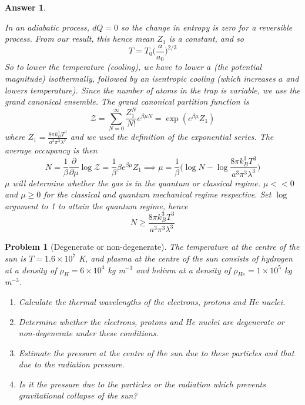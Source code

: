 \documentclass[a4paper]{article}
\theoremstyle{new2}
\newtheorem{ans}{Answer}[section]
\theoremstyle{new}
\newtheorem{qns}{Problem}[section]
\begin{document}
\begin{ans}
\begin{center}
\end{center}
In an adiabatic process, $dQ=0$ so the change in entropy is zero for a reversible process. From our result, this hence mean $Z_1$ is a constant, and so
$$T=T_0\bigg(\frac{a}{a_0}\bigg)^{2/3}$$
So to lower the temperature (cooling), we have to lower $a$ (the potential magnitude) isothermally, followed by an isentropic cooling (which increases $a$ and lowers temperature). Since the number of atoms in the trap is variable, we use the grand canonical ensemble. The grand canonical partition function is
$$\mathcal{Z}=\sum_{N=0}^\infty\frac{Z_1^N}{N!}e^{\beta\mu N}=\exp(e^{\beta\mu}Z_1)$$
where $Z_1=\frac{8\pi k_B^3T^3}{a^3\pi^3\lambda^3}$ and we used the definition of the exponential series. The average occupancy is then
$$N=\frac{1}{\beta}\frac{\partial}{\partial\mu}\log\mathcal{Z}=\frac{1}{\beta}\beta e^{\beta\mu}Z_1\implies \mu=\frac{1}{\beta}\bigg(\log N-\log\frac{8\pi k_B^3T^3}{a^3\pi^3\lambda^3}\bigg)$$
$\mu$ will determine whether the gas is in the quantum or classical regime. $\mu<<0$ and $\mu\geq0$ for the classical and quantum mechanical regime respective. Set $\log$ argument to 1 to attain the quantum regime, hence
$$N\geq\frac{8\pi k_B^3T^3}{a^3\pi^3\lambda^3}$$
\end{ans}
\begin{qns}[Degenerate or non-degenerate]
The temperature at the centre of the sun is $T = 1.6\times 10^7$ K, and plasma at the centre of the sun consists of hydrogen at a density of $\rho_H = 6\times10^4$ kg m$^{−3}$ and helium at a density of $\rho_{He} = 1\times10^5$ kg m$^{−3}$.
\begin{enumerate}[label=(\alph*)]
\item Calculate the thermal wavelengths of the electrons, protons and He nuclei.
\item Determine whether the electrons, protons and He nuclei are degenerate or non-degenerate under these conditions.
\item Estimate the pressure at the centre of the sun due to these particles and that due to the radiation pressure.
\item Is it the pressure due to the particles or the radiation which prevents gravitational collapse of the sun?
\end{enumerate}
\end{qns}
\end{document}
